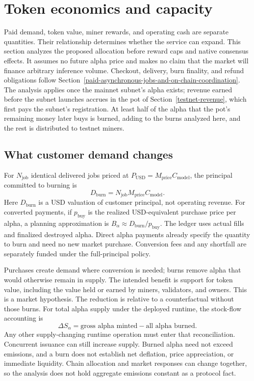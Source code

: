 \section{Token economics and capacity}\label{token-economics}

Paid demand, token value, miner rewards, and operating cash are separate
quantities. Their relationship determines whether the service can expand.
This section analyzes the proposed allocation before reward caps and native
consensus effects. It assumes no future alpha price and makes no claim that
the market will finance arbitrary inference volume. Checkout, delivery, burn
finality, and refund obligations follow
Section~\ref{paid-asynchronous-jobs-and-on-chain-coordination}. The analysis
applies once the mainnet subnet's alpha exists; revenue earned before the
subnet launches accrues in the pot of Section~\ref{testnet-revenue}, which
first pays the subnet's registration. At least half of the alpha that the
pot's remaining money later buys is burned, adding to the burns analyzed here,
and the rest is distributed to testnet miners.

\subsection{What customer demand changes}

For \(N_{\mathrm{job}}\) identical delivered jobs priced at
\(P_{\mathrm{USD}}=M_{\mathrm{price}} C_{\mathrm{model}}\), the principal committed to burning is
\begin{equation}\label{eq:burn-principal}
 D_{\mathrm{burn}}=N_{\mathrm{job}} M_{\mathrm{price}} C_{\mathrm{model}}.
\end{equation}
Here \(D_{\mathrm{burn}}\) is a USD valuation of customer principal, not operating revenue.
For converted payments, if \(p_{\mathrm{buy}}\) is the realized USD-equivalent
purchase price per alpha, a planning approximation is
\(B_\alpha\approx D_{\mathrm{burn}}/p_{\mathrm{buy}}\). The ledger uses actual fills and
finalized destroyed alpha. Direct alpha payments already specify the quantity
to burn and need no new market purchase. Conversion fees and any shortfall
are separately funded under the full-principal policy.

Purchases create demand where conversion is needed; burns remove alpha that
would otherwise remain in supply. The intended benefit is support for token
value, including the value held or earned by miners, validators, and owners.
This is a market hypothesis. The reduction is relative to a counterfactual
without those burns. For total alpha supply under the deployed runtime,
the stock-flow accounting is
\[
 \Delta S_\alpha=\text{gross alpha minted}-\text{all alpha burned}.
\]
Any other supply-changing runtime operation must enter that reconciliation.
Concurrent issuance can still increase supply. Burned
alpha need not exceed emissions, and a burn does not establish net deflation,
price appreciation, or immediate liquidity. Chain allocation and market
responses can change together, so the analysis does not hold aggregate
emissions constant as a protocol fact.

